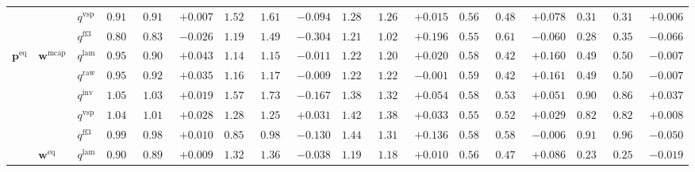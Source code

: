 \documentclass[eng]{kjas3}
\begin{document}
\begin{table}[t]
{\begin{tabular}{lll ccc ccc ccc ccc ccc}
 &  & $q^{\mathrm{vsp}}$ & $0.918$ & $0.911$ & \cellcolor{posgreen!50}$+0.007$ & $1.524$ & $1.618$ & \cellcolor{negred!50}$-0.094$ & $1.281$ & $1.266$ & \cellcolor{posgreen!50}$+0.015$ & $0.566$ & $0.488$ & \cellcolor{posgreen!50}$+0.078$ & $0.318$ & $0.312$ & \cellcolor{posgreen!50}$+0.006$ \\
 &  & $q^{\mathrm{ff3}}$ & $0.805$ & $0.831$ & \cellcolor{negred!50}$-0.026$ & $1.194$ & $1.498$ & \cellcolor{negred!50}$-0.304$ & $1.218$ & $1.022$ & \cellcolor{posgreen!50}$+0.196$ & $0.557$ & $0.617$ & \cellcolor{negred!50}$-0.060$ & $0.289$ & $0.356$ & \cellcolor{negred!50}$-0.066$ \\
\midrule
$\mathbf{p}^{\mathrm{eq}}$ & $\mathbf{w}^{\mathrm{mcap}}$ & $q^{\mathrm{lam}}$ & $0.950$ & $0.907$ & \cellcolor{posgreen!50}$+0.043$ & $1.147$ & $1.159$ & \cellcolor{negred!50}$-0.011$ & $1.226$ & $1.207$ & \cellcolor{posgreen!50}$+0.020$ & $0.584$ & $0.425$ & \cellcolor{posgreen!50}$+0.160$ & $0.499$ & $0.505$ & \cellcolor{negred!50}$-0.007$ \\
 &  & $q^{\mathrm{raw}}$ & $0.958$ & $0.923$ & \cellcolor{posgreen!50}$+0.035$ & $1.164$ & $1.173$ & \cellcolor{negred!50}$-0.009$ & $1.220$ & $1.221$ & \cellcolor{negred!50}$-0.001$ & $0.590$ & $0.429$ & \cellcolor{posgreen!50}$+0.161$ & $0.499$ & $0.505$ & \cellcolor{negred!50}$-0.007$ \\
 &  & $q^{\mathrm{inv}}$ & $1.057$ & $1.038$ & \cellcolor{posgreen!50}$+0.019$ & $1.571$ & $1.738$ & \cellcolor{negred!50}$-0.167$ & $1.380$ & $1.326$ & \cellcolor{posgreen!50}$+0.054$ & $0.585$ & $0.534$ & \cellcolor{posgreen!50}$+0.051$ & $0.903$ & $0.865$ & \cellcolor{posgreen!50}$+0.037$ \\
 &  & $q^{\mathrm{vsp}}$ & $1.040$ & $1.011$ & \cellcolor{posgreen!50}$+0.028$ & $1.287$ & $1.256$ & \cellcolor{posgreen!50}$+0.031$ & $1.422$ & $1.389$ & \cellcolor{posgreen!50}$+0.033$ & $0.551$ & $0.522$ & \cellcolor{posgreen!50}$+0.029$ & $0.828$ & $0.820$ & \cellcolor{posgreen!50}$+0.008$ \\
 &  & $q^{\mathrm{ff3}}$ & $0.998$ & $0.988$ & \cellcolor{posgreen!50}$+0.010$ & $0.857$ & $0.987$ & \cellcolor{negred!50}$-0.130$ & $1.448$ & $1.312$ & \cellcolor{posgreen!50}$+0.136$ & $0.582$ & $0.588$ & \cellcolor{negred!50}$-0.006$ & $0.910$ & $0.961$ & \cellcolor{negred!50}$-0.050$ \\
\cmidrule(lr){2-18}
 & $\mathbf{w}^{\mathrm{eq}}$ & $q^{\mathrm{lam}}$ & $0.908$ & $0.898$ & \cellcolor{posgreen!50}$+0.009$ & $1.329$ & $1.367$ & \cellcolor{negred!50}$-0.038$ & $1.199$ & $1.189$ & \cellcolor{posgreen!50}$+0.010$ & $0.564$ & $0.478$ & \cellcolor{posgreen!50}$+0.086$ & $0.237$ & $0.257$ & \cellcolor{negred!50}$-0.019$ \\

\end{tabular}}
\end{table}
\end{document}
